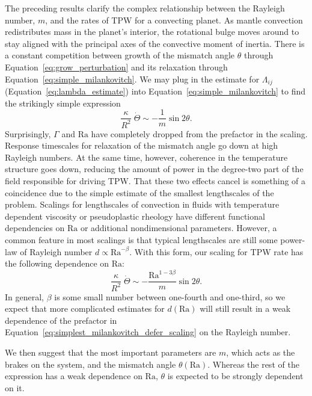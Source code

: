 \documentclass[extra,mreferee]{gji}
\begin{document}
The preceding results clarify the complex relationship between the Rayleigh number, $m$, and the rates of TPW for a convecting planet.
As mantle convection redistributes mass in the planet's interior, the rotational bulge moves around to stay aligned with the principal axes of the convective moment of inertia. 
There is a constant competition between growth of the mismatch angle $\theta$ through 
Equation~\eqref{eq:grow_perturbation} and its relaxation through Equation~\eqref{eq:simple_milankovitch}.
We may plug in the estimate for $\Lambda_{ij}$ (Equation~\eqref{eq:lambda_estimate}) into Equation~\eqref{eq:simple_milankovitch} to find the strikingly simple expression
\begin{equation}
\frac{\kappa}{R^2} \; \dot{\Theta} \sim -\frac{1}{m} \sin{2 \theta}.
\label{eq:simplest_milankovitch}
\end{equation}
Surprisingly, $\Gamma$ and $\mathrm{Ra}$ have completely dropped from the prefactor in the scaling. 
Response timescales for relaxation of the mismatch angle go down at high Rayleigh numbers.
At the same time, however, coherence in the temperature structure goes down, reducing the amount of power in the degree-two part of the field responsible for driving TPW.
That these two effects cancel is something of a coincidence due to the simple estimate of the smallest lengthscales of the problem.
Scalings for lengthscales of convection in fluids with temperature dependent viscosity \citep[e.g.][]{solomatov1995scaling} or pseudoplastic rheology \citep[e.g.][]{korenaga2010scaling} have different functional dependencies on $\mathrm{Ra}$ or additional nondimensional parameters.
However, a common feature in most scalings is that typical lengthscales are still some power-law of Rayleigh number $d \propto \mathrm{Ra}^{-\beta}$.
With this form, our scaling for TPW rate has the following dependence on $\mathrm{Ra}$:
\begin{equation}
\frac{\kappa}{R^2} \; \dot{\Theta} \sim -\frac{\mathrm{Ra}^{1-3\beta}}{m} \sin{2 \theta}.
\label{eq:simplest_milankovitch_defer_scaling}
\end{equation}
In general, $\beta$ is some small number between one-fourth and one-third, so we expect that more complicated estimates for 
$d(\mathrm{Ra})$ will still result in a weak dependence of the prefactor in Equation~\eqref{eq:simplest_milankovitch_defer_scaling} 
on the Rayleigh number.

We then suggest that the most important parameters are $m$, which acts as the brakes on the system, and the mismatch angle $\theta(\mathrm{Ra})$.
Whereas the rest of the expression has a weak dependence on $\mathrm{Ra}$, $\theta$ is expected to be strongly dependent on it.
\end{document}

